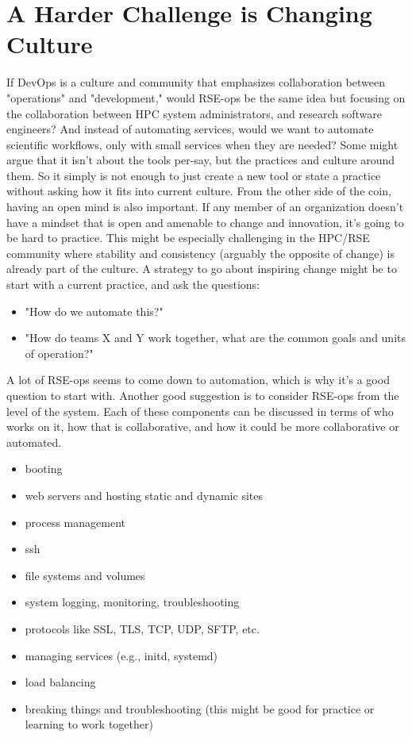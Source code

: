 \section{A Harder Challenge is Changing Culture}


If DevOps is a culture and community that emphasizes collaboration between "operations" and "development," would RSE-ops be the same idea but focusing on the collaboration between HPC system administrators, and research software engineers? And instead of automating services, would we want to automate scientific workflows, only with small services when they are needed? Some might argue that it isn't about the tools per-say, but the practices and culture around them. So it simply is not enough to just create a new tool or state a practice without asking how it fits into current culture. From the other side of the coin, having an open mind is also important. If any member of an organization doesn't have a mindset that is open and amenable to change and innovation, it's going to be hard to practice. This might be especially challenging in the HPC/RSE community where stability and consistency (arguably the opposite of change) is already part of the culture.
A strategy to go about inspiring change might be to start with a current practice, and ask the questions:
 
 \begin{itemize}
\item "How do we automate this?"
 \item "How do teams X and Y work together, what are the common goals and units of operation?"
\end{itemize}

A lot of RSE-ops seems to come down to automation, which is why it's a good question to start with.
Another good suggestion is to consider RSE-ops from the level of the system. Each of these components can be discussed in terms of who works on it, how that is collaborative, and how it could be more collaborative or automated.

\begin{itemize}
\item booting
\item web servers and hosting static and dynamic sites
\item process management
\item ssh
\item file systems and volumes
\item system logging, monitoring, troubleshooting
\item protocols like SSL, TLS, TCP, UDP, SFTP, etc.
\item managing services (e.g., initd, systemd)
\item load balancing
\item breaking things and troubleshooting (this might be good for practice or learning to work together)
\end{itemize}

